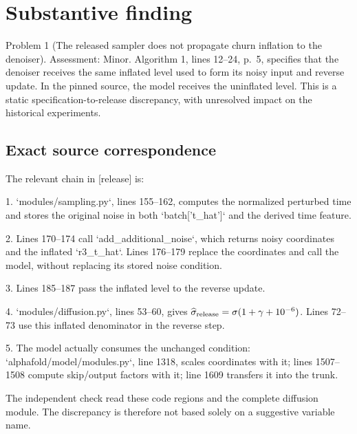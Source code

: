 \documentclass[10pt]{article}
\begin{document}
\section*{Substantive finding}
Problem 1 (The released sampler does not propagate churn inflation to the denoiser).  Assessment: Minor. Algorithm 1, lines 12–24, p. 5, specifies that the denoiser receives the same inflated level used to form its noisy input and reverse update. In the pinned source, the model receives the uninflated level. This is a static specification-to-release discrepancy, with unresolved impact on the historical experiments.\par
\subsection*{Exact source correspondence}
The relevant chain in [release] is:\par
1. `modules/sampling.py`, lines 155–162, computes the normalized perturbed time and stores the original noise in both `batch[’t\_hat’]` and the derived time feature.\par
2. Lines 170–174 call `add\_additional\_noise`, which returns noisy coordinates and the inflated `r3\_t\_hat`. Lines 176–179 replace the coordinates and call the model, without replacing its stored noise condition.\par
3. Lines 185–187 pass the inflated level to the reverse update.\par
4. `modules/diffusion.py`, lines 53–60, gives \(\widehat{\sigma}_{\rm release}=\sigma(1+\gamma+10^{-6})\). Lines 72–73 use this inflated denominator in the reverse step.\par
5. The model actually consumes the unchanged condition: `alphafold/model/modules.py`, line 1318, scales coordinates with it; lines 1507–1508 compute skip/output factors with it; line 1609 transfers it into the trunk.\par
The independent check read these code regions and the complete diffusion module. The discrepancy is therefore not based solely on a suggestive variable name.\par
\end{document}
